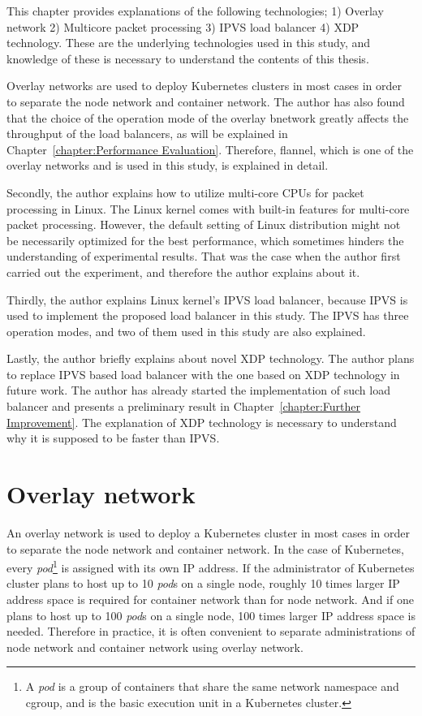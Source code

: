 

  This chapter provides explanations of the following technologies;
  1) Overlay network
  2) Multicore packet processing
  3) IPVS load balancer
  4) XDP technology.
  These are the underlying technologies used in this study, and knowledge of these is necessary to understand the contents of this thesis.





Overlay networks are used to deploy Kubernetes clusters in most cases in order to separate the node network and container network.
The author has also found that the choice of the operation mode of the overlay bnetwork greatly affects the throughput of the load balancers, as will be explained in Chapter~\ref{chapter:Performance Evaluation}.
Therefore, flannel, which is one of the overlay networks and is used in this study, is explained in detail.

Secondly, the author explains how to utilize multi-core CPUs for packet processing in Linux.
The Linux kernel comes with built-in features for multi-core packet processing.
However, the default setting of Linux distribution might not be necessarily optimized for the best performance, which sometimes hinders the understanding of experimental results.
That was the case when the author first carried out the experiment, and therefore the author explains about it.

Thirdly, the author explains Linux kernel's IPVS load balancer, because IPVS is used to implement the proposed load balancer in this study.
The IPVS has three operation modes, and two of them used in this study are also explained.

Lastly, the author briefly explains about novel XDP technology.
The author plans to replace IPVS based load balancer with the one based on XDP technology in future work.
The author has already started the implementation of such load balancer and presents a preliminary result in Chapter~\ref{chapter:Further Improvement}.
The explanation of XDP technology is necessary to understand why it is supposed to be faster than IPVS.


\section{Overlay network}


  An overlay network is used to deploy a Kubernetes cluster in most cases in order to separate the node network and container network.
  In the case of Kubernetes, every {\em pod}\footnote{A {\em pod} is a group of containers that share the same network namespace and cgroup, and is the basic execution unit in a Kubernetes cluster.} is assigned with its own IP address.
  If the administrator of Kubernetes cluster plans to host up to 10 {\em pod}s on a single node, roughly 10 times larger IP address space is required for container network than for node network.
  And if one plans to host up to 100 {\em pod}s on a single node, 100 times larger IP address space is needed.
  Therefore in practice, it is often convenient to separate administrations of node network and container network using overlay network.


